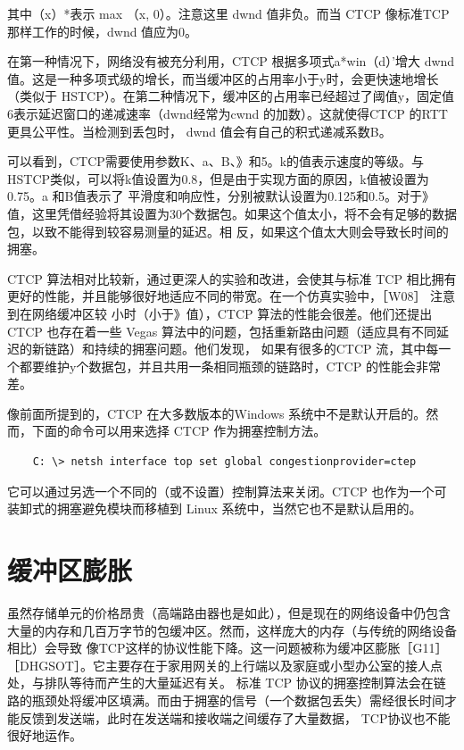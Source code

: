 其中（x）*表示 max （x, 0）。注意这里 dwnd 值非负。而当 CTCP 像标准TCP 那样工作的时候，dwnd 值应为0。

在第一种情况下，网络没有被充分利用，CTCP 根据多项式a*win（d）'增大 dwnd值。这是一种多项式级的增长，而当缓冲区的占用率小于y时，会更快速地增长（类似于
HSTCP）。在第二种情况下，缓冲区的占用率已经超过了阈值y，固定值6表示延迟窗口的递减速率（dwnd经常为cwnd 的加数）。这就使得CTCP 的RTT更具公平性。当检测到丢包时，
dwnd 值会有自己的积式递减系数B。

可以看到，CTCP需要使用参数K、a、B、》和5。k的值表示速度的等级。与HSTCP类似，可以将k值设置为0.8，但是由于实现方面的原因，k值被设置为0.75。a 和B值表示了
平滑度和响应性，分别被默认设置为0.125和0.5。对于》值，这里凭借经验将其设置为30个数据包。如果这个值太小，将不会有足够的数据包，以致不能得到较容易测量的延迟。相
反，如果这个值太大则会导致长时间的拥塞。

CTCP 算法相对比较新，通过更深人的实验和改进，会使其与标准 TCP 相比拥有更好的性能，并且能够很好地适应不同的带宽。在一个仿真实验中，［W08］ 注意到在网络缓冲区较
小时（小于》值），CTCP 算法的性能会很差。他们还提出 CTCP 也存在着一些 Vegas 算法中的问题，包括重新路由问题（适应具有不同延迟的新链路）和持续的拥塞问题。他们发现，
如果有很多的CTCP 流，其中每一个都要维护y个数据包，并且共用一条相同瓶颈的链路时，CTCP 的性能会非常差。

像前面所提到的，CTCP 在大多数版本的Windows 系统中不是默认开启的。然而，下面的命令可以用来选择 CTCP 作为拥塞控制方法。

\begin{verbatim}
    C: \> netsh interface top set global congestionprovider=ctep
\end{verbatim}

它可以通过另选一个不同的（或不设置）控制算法来关闭。CTCP 也作为一个可装卸式的拥塞避免模块而移植到 Linux 系统中，当然它也不是默认启用的。

\section{缓冲区膨胀}
虽然存储单元的价格昂贵（高端路由器也是如此），但是现在的网络设备中仍包含大量的内存和几百万字节的包缓冲区。然而，这样庞大的内存（与传统的网络设备相比）会导致
像TCP这样的协议性能下降。这一问题被称为缓冲区膨胀［G11］［DHGSOT］。它主要存在于家用网关的上行端以及家庭或小型办公室的接人点处，与排队等待而产生的大量延迟有关。
标准 TCP 协议的拥塞控制算法会在链路的瓶颈处将缓冲区填满。而由于拥塞的信号（一个数据包丢失）需经很长时间才能反馈到发送端，此时在发送端和接收端之间缓存了大量数据，
TCP协议也不能很好地运作。

